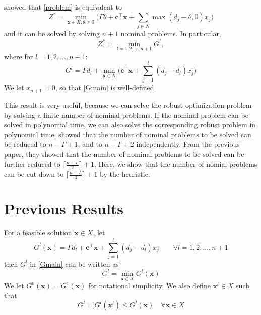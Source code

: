 \documentclass[letterpaper, 10pt]{article}
\renewcommand{\vec}[1]{\bm{#1}}
\begin{document}
\citet{Bertsimas2003} showed that \eqref{problem} is equivalent to
\begin{equation} \label{bs_dual}
	Z^* = \min_{\vec{x}\in X, \theta\geq0} \bigg(
		\Gamma \theta + \vec{c}^\top \vec{x} + \sum_{j\in N} \max(d_j - \theta, 0) x_j 
	\bigg)
\end{equation}
and it can be solved by solving $n+1$ nominal problems. In particular,
\begin{equation} \label{main}
Z^* = \min_{l=1,2,\cdots,n+1} G^l,
\end{equation}
where for $ l = 1, 2, \dots, n+1$:
\begin{equation} \label{Gmain}
G^l = \Gamma d_l + \min_{\vec{x} \in X} \bigg( \vec{c}^\top \vec{x} + \sum_{j=1}^l (d_j - d_l) x_j \bigg)
\end{equation}
We let $x_{n+1}=0$, so that \eqref{Gmain} is well-defined. 

This result is very useful, because we can solve the robust optimization problem by solving a finite number of nominal problems. 
If the nominal problem can be solved in polynomial time, we can also solve the corresponding robust problem in polynomial time. 
\citet{Park2007} showed that the number of nominal problems to be solved can be reduced to $n-\Gamma+1$, and \citet{Alvarez2013} to $n-\Gamma+2$ independently.
From the previous paper, they showed that the number of nominal problems to be solved can be further reduced to $\lceil \frac{n-\Gamma}{2} \rceil + 1$.
Here, we show that the number of nomial problems can be cut down to $\lceil \frac{n-\Gamma}{4} \rceil + 1$ by the heuristic.

\section{Previous Results}

For a feasible solution $\vec{x} \in X$, let 
\begin{equation}
G^l (\vec{x}) = \Gamma d_l + \vec{c}^\top \vec{x} + \sum_{j=1}^l (d_j - d_l) x_j \qquad \forall l=1,2,...,n+1
\end{equation}
then $G^l$ in \eqref{Gmain} can be written as
\begin{equation}
G^l = \min_{\vec{x} \in X} G^l (\vec{x})
\end{equation}
We let $G^0(\vec{x})=G^1(\vec{x})$ for notational simplicity. We also define $\vec{x}^l\in X$ such that
\begin{equation} \label{xldef}
G^l = G^l(\vec{x}^l) \leq G^l(\vec{x}) \quad \forall \vec{x}\in X
\end{equation}
\end{document}
